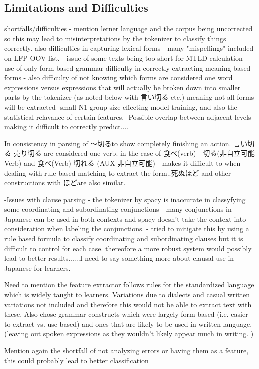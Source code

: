 

\subsection{Limitations and Difficulties}
shortfalls/difficulties
- mention lerner language and the corpus being uncorrected so this may lead to misinterpretations by the tokenizer to classify things correctly.
    also difficulties in capturing lexical forms - many "mispellings" included on LFP OOV list.
- issue of some texts being too short for MTLD calculation
- use of only form-based grammar difficulty in correctly extracting meaning based forms
- also difficulty of not knowing which forms are considered one word expressions versus expressions that will
actually be broken down into smaller parts by the tokenizer (as noted below with 言い切る etc.) meaning not all forms
will be extracted
-small N1 group size effecting model training, and also the statistical relavance of certain features.
-Possible overlap between adjacent levels making it difficult to correctly predict....

In consistency in parsing of 〜切るto show completely finishing an action. 言い切る 売り切る are considered one verb. in the
case of 食べ(verb)　切る(非自立可能Verb) and 食べ(Verb) 切れる (AUX 非自立可能)　makes it difficult to when dealing with rule based
matching to extract the form..死ぬほど and other constructions with ほどare also similar.

-Issues with clause parsing - the tokenizer by spacy is inaccurate in classyfying some coordinating and
subordinating conjunctions - many conjunctions in Japanese can be used in both contexts and spacy doesn't take the
context into consideration when labeling the conjunctions. - tried to mitigate this by using a rule based formula to
classify coordinating and subordinating clauses but it is difficult to control for each case. thereofore a more
robust system would possibly lead to better results......I need to say something more about clausal use in Japanese
for learners.


Need to mention the feature extractor follows rules for the standardized language which is widely taught to
learners. Variations due to dialects and casual written variations not included and therefore this would not be
able to extract text with these. Also chose grammar constructs which were largely form based (i.e. easier to extract
vs. use based) and ones that are likely to be used in written language. (leaving out spoken expressions as they
wouldn't likely appear much in writing. )

Mention again the shortfall of not analyzing errors or having them as a feature, this could probably lead to better
classification